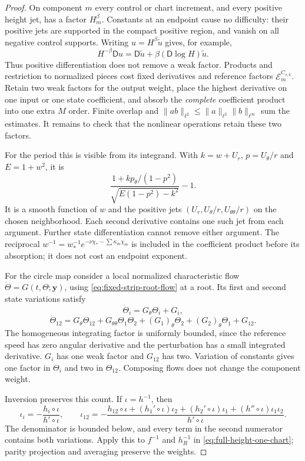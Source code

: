 \begin{proof}
On component $m$ every control or chart increment, and every positive
height jet, has a factor $H_m^\beta$. Constants at an endpoint cause
no difficulty: their positive jets are supported in the compact
positive region, and vanish on all negative control supports.
Writing $u=H^\beta\widetilde u$ gives, for example,
\[
 H^{-\beta}\mathsf D u
 =\mathsf D\widetilde u+\beta(\mathsf D\log H)\widetilde u.
\]
Thus positive differentiation does not remove a weak factor.
Products and restriction to normalized pieces cost fixed derivatives
and reference factors $\mathcal E_m^{C_{s,k}}$.
Retain two weak factors for the output weight, place the highest
derivative on one input or one state coefficient, and absorb the
\emph{complete} coefficient product into one extra $M$ order.
Finite overlap and
$\|ab\|_{\ell^2}\le\|a\|_{\ell^2}\|b\|_{\ell^\infty}$
sum the estimates. It remains to check that the nonlinear operations
retain these two factors.

For the period this is visible from its integrand. With
$k=w+U_r$, $p=U_\theta/r$ and $E=1+w^2$, it is
\[
 \frac{1+kp_\theta/(1-p^2)}{\sqrt{E(1-p^2)-k^2}}-1.
\]
It is a smooth function of $w$ and the positive jets
$(U_r,U_\theta/r,U_{\theta\theta}/r)$ on the chosen neighborhood.
Each second derivative contains one such jet from each argument.
Further state differentiation cannot remove either argument.
The reciprocal $w^{-1}=w_*^{-1}
 e^{-\nu\chi_*-\sum\kappa_m\chi_m}$ is included in the coefficient
product before its absorption; it does not cost an endpoint exponent.

For the circle map consider a local normalized characteristic flow
$\dot\Theta=G(t,\Theta;\mathbf y)$, using
\eqref{eq:fixed-strip-root-flow} at a root. Its first and second
state variations satisfy
\[
 \dot\Theta_i=G_\theta\Theta_i+G_i,
\]
\[
 \dot\Theta_{12}=G_\theta\Theta_{12}
   +G_{\theta\theta}\Theta_1\Theta_2
   +(G_1)_\theta\Theta_2+(G_2)_\theta\Theta_1+G_{12}.
\]
The homogeneous integrating factor is uniformly bounded, since the
reference speed has zero angular derivative and the perturbation has
a small integrated derivative. $G_i$ has one weak factor and
$G_{12}$ has two. Variation of constants gives one factor in
$\Theta_i$ and two in $\Theta_{12}$. Composing flows does not change
the component weight.

Inversion preserves this count. If $\iota=h^{-1}$, then
\[
 \iota_i=-\frac{h_i\circ\iota}{h'\circ\iota},\qquad
 \iota_{12}=-\frac{h_{12}\circ\iota
 +(h_1'\circ\iota)\iota_2+(h_2'\circ\iota)\iota_1
 +(h''\circ\iota)\iota_1\iota_2}{h'\circ\iota}.
\]
The denominator is bounded below, and every term in the second
numerator contains both variations. Apply this to $f^{-1}$ and
$h_R^{-1}$ in \eqref{eq:full-height-one-chart}; parity projection
and averaging preserve the weights.


\end{proof}

